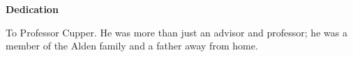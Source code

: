 %
%
\begin{dedication}
\vspace*{.68in}
    \begin{Huge}
        \textbf{Dedication\\}
        \vspace{.355in}
    \end{Huge}

To Professor Cupper. He was more than just an advisor and professor; he was a member of the Alden family and a father away from home.
\end{dedication}